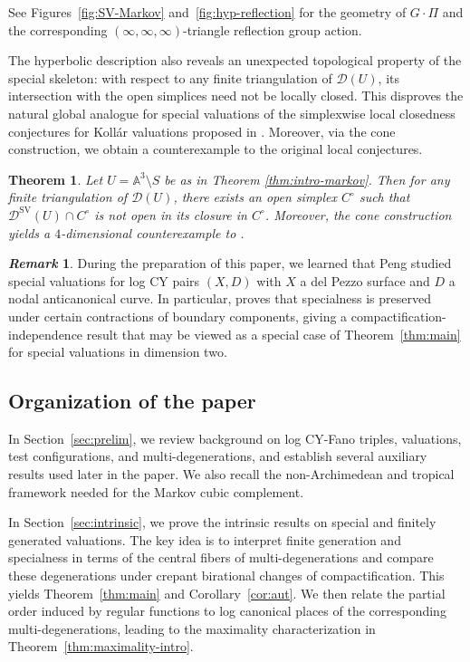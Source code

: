 \documentclass[reqno, 12pt]{amsart}
\newtheorem{thm}[prop]{Theorem}
\theoremstyle{definition}
\newtheorem{rem}[prop]{\it Remark}
\newcommand{\bA}{\mathbb{A}}
\newcommand{\cD}{\mathcal{D}}
\newcommand{\SV}{\mathrm{SV}}
\numberwithin{equation}{section}
\begin{document}
See Figures~\ref{fig:SV-Markov} and~\ref{fig:hyp-reflection}
for the geometry of $G\cdot\Pi$ and the corresponding
$(\infty,\infty,\infty)$-triangle reflection group action.



The hyperbolic description also reveals an unexpected topological property of the special skeleton: with respect to any finite triangulation of $\cD(U)$, its intersection with the open simplices need not be locally closed. This disproves the natural global analogue for special valuations of the simplexwise local closedness conjectures for Koll\'ar valuations proposed in \cite[Conjecture~1.8(1),(1')]{LX24}. Moreover, via the cone construction, we obtain a counterexample to the original local conjectures.

\begin{thm}\label{thm:counterex-LX24}
Let $U=\bA^3\setminus S$ be as in Theorem \ref{thm:intro-markov}. Then for any finite triangulation of $\cD(U)$, there exists an open simplex $C^\circ$ such that $\cD^{\SV}(U)\cap C^\circ$ is not open in its closure in $C^{\circ}$.
Moreover, the cone construction yields a $4$-dimensional counterexample to \cite[Conjecture~1.8(1),(1')]{LX24}.
\end{thm}

\begin{rem}
During the preparation of this paper, we learned that Peng \cite{Pen25} studied special valuations for log CY pairs $(X,D)$ with $X$ a del Pezzo surface and $D$ a nodal anticanonical curve. In particular, \cite[Theorem~1.3(d)]{Pen25} proves that specialness is preserved under certain contractions of boundary components, giving a compactification-independence result that may be viewed as a special case of Theorem~\ref{thm:main} for special valuations in dimension two.
\end{rem}

\subsection*{Organization of the paper}

In Section~\ref{sec:prelim}, we review background on log CY-Fano triples,
valuations, test configurations, and multi-degenerations, and
establish several auxiliary results used later in the paper.
We also recall the non-Archimedean and tropical framework
needed for the Markov cubic complement.

In Section~\ref{sec:intrinsic}, we prove the intrinsic results on special and
finitely generated valuations. The key idea is to interpret
finite generation and specialness in terms of the central
fibers of multi-degenerations and compare these degenerations
under crepant birational changes of compactification. This
yields Theorem~\ref{thm:main} and Corollary~\ref{cor:aut}. We then relate the
partial order induced by regular functions to log canonical
places of the corresponding multi-degenerations, leading to
the maximality characterization in Theorem~\ref{thm:maximality-intro}.
\end{document}
